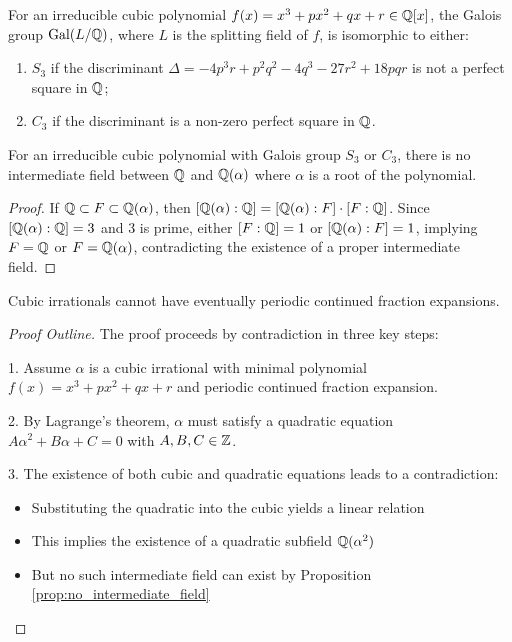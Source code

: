 \begin{theorem}\label{thm:cubic_galois}
For an irreducible cubic polynomial $f(x) = x^3 + px^2 + qx + r \in \mathbb{Q}[x]$, the Galois group $\operatorname{Gal}(L/\mathbb{Q})$, where $L$ is the splitting field of $f$, is isomorphic to either:
\begin{enumerate}
    \item $S_3$ if the discriminant $\Delta = -4p^3r + p^2q^2 - 4q^3 - 27r^2 + 18pqr$ is not a perfect square in $\mathbb{Q}$;
    \item $C_3$ if the discriminant is a non-zero perfect square in $\mathbb{Q}$.
\end{enumerate}
\end{theorem}

\begin{proposition}\label{prop:no_intermediate_field}
For an irreducible cubic polynomial with Galois group $S_3$ or $C_3$, there is no intermediate field between $\mathbb{Q}$ and $\mathbb{Q}(\alpha)$ where $\alpha$ is a root of the polynomial.
\end{proposition}

\begin{proof}
If $\mathbb{Q} \subset F \subset \mathbb{Q}(\alpha)$, then $[\mathbb{Q}(\alpha):\mathbb{Q}] = [\mathbb{Q}(\alpha):F] \cdot [F:\mathbb{Q}]$. Since $[\mathbb{Q}(\alpha):\mathbb{Q}] = 3$ and 3 is prime, either $[F:\mathbb{Q}] = 1$ or $[\mathbb{Q}(\alpha):F] = 1$, implying $F = \mathbb{Q}$ or $F = \mathbb{Q}(\alpha)$, contradicting the existence of a proper intermediate field.
\end{proof}

\begin{theorem}\label{thm:non_periodicity}
Cubic irrationals cannot have eventually periodic continued fraction expansions.
\end{theorem}

\begin{proof}[Proof Outline]
The proof proceeds by contradiction in three key steps:

1. Assume $\alpha$ is a cubic irrational with minimal polynomial $f(x) = x^3 + px^2 + qx + r$ and periodic continued fraction expansion.

2. By Lagrange's theorem, $\alpha$ must satisfy a quadratic equation $A\alpha^2 + B\alpha + C = 0$ with $A, B, C \in \mathbb{Z}$.

3. The existence of both cubic and quadratic equations leads to a contradiction:
   \begin{itemize}
   \item Substituting the quadratic into the cubic yields a linear relation
   \item This implies the existence of a quadratic subfield $\mathbb{Q}(\alpha^2)$
   \item But no such intermediate field can exist by Proposition \ref{prop:no_intermediate_field}
   \end{itemize}

\end{proof}

